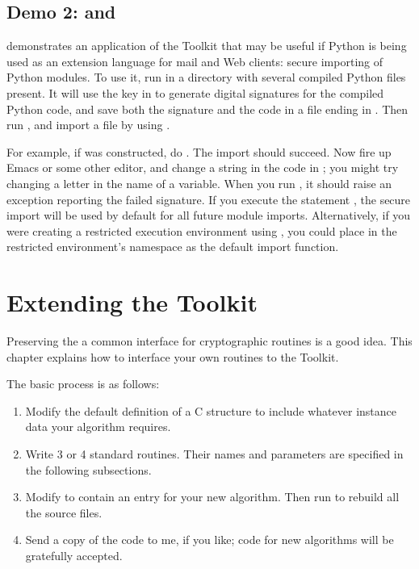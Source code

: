 \documentclass{howto}
\begin{document}
\subsection{Demo 2:  and }

 demonstrates an application of the Toolkit that may be
useful if Python is being used as an extension language for mail and Web
clients: secure importing of Python modules.  To use it, run
 in a directory with several compiled Python files
present.  It will use the key in  to generate digital
signatures for the compiled Python code, and save both the signature and
the code in a file ending in .  Then run , and import a file by using .  

For example, if  was constructed, do
.  The import should succeed.  Now fire up Emacs
or some other editor, and change a string in the code in ;
you might try changing a letter in the name of a variable.  When you run
, it should raise an exception reporting the
failed signature.  If you execute the statement , the secure import will be used by default for all future
module imports.  Alternatively, if you were creating a restricted
execution environment using , you could place
 in the restricted environment's namespace as the
default import function.

\section{Extending the Toolkit}
Preserving the a common interface for cryptographic routines is a
good idea.  This chapter
explains how to interface your own routines to the Toolkit.

The basic process is as follows:
\begin{enumerate}
\item  Modify the default definition of a C structure to include
whatever instance data your algorithm requires.
\item  Write 3 or 4 standard routines.  Their names and parameters are
specified in the following subsections.
\item  Modify  to contain an entry for your new
algorithm.  Then run  to rebuild all the source files. 
\item  Send a copy of the code to me, if you like; code for new
algorithms will be gratefully accepted.
\end{enumerate}
\end{document}
